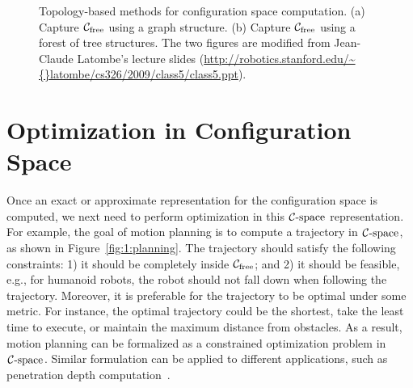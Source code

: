 \begin{figure}[!htb]
  \centering
  \caption[Topology-based methods for configuration space computation]{Topology-based methods for configuration space computation. (a) Capture $\mathcal C_{\text{free}}$ using a graph structure. (b) Capture $\mathcal C_{\text{free}}$ using a forest of tree structures. The two figures are modified from Jean-Claude Latombe's lecture slides (\url{http://robotics.stanford.edu/\~{}latombe/cs326/2009/class5/class5.ppt}).}\label{fig:1:topologycspace}
\end{figure}




\section{Optimization in Configuration Space}
\label{sec:1:optimization}
Once an exact or approximate representation for the configuration space is computed, we next need to perform optimization in this $\mathcal C\text{-space}$ representation. For example, the goal of motion planning is to compute a trajectory in $\mathcal C\text{-space}$, as shown in Figure~\ref{fig:1:planning}. The trajectory should satisfy the following constraints: 1) it should be completely inside $\mathcal C_{\text{free}}$; and 2) it should be feasible, e.g., for humanoid robots, the robot should not fall down when following the trajectory. Moreover, 
it is preferable for the trajectory to be optimal under some metric. For instance, the optimal trajectory could be the shortest, take the least time to execute, or maintain the maximum distance from obstacles.
As a result, motion planning can be formalized as a constrained optimization problem in $\mathcal C\text{-space}$. Similar formulation can be applied to different applications, such as penetration depth computation~\cite{Zhang:2007:GPD,Zhang:2007:AFP,Zhang:2008:ICRA,Je:2012:PRP}.


